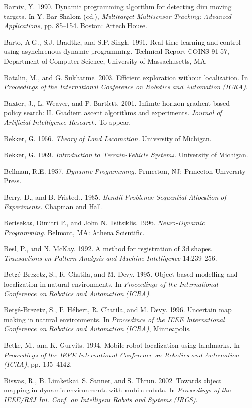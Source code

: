 \documentclass[10pt,a4paper]{article}
\begin{document}
Barniv, Y. 1990. Dynamic programming algorithm for detecting dim moving targets.
In Y. Bar-Shalom (ed.), \textit{Multitarget-Multisensor Tracking: Advanced Applications}, pp.
85–154. Boston: Artech House.

Barto, A.G., S.J. Bradtke, and S.P. Singh. 1991. Real-time learning and control using
asynchronous dynamic programming. Technical Report COINS 91-57, Department
of Computer Science, University of Massachusetts, MA.

Batalin, M., and G. Sukhatme. 2003. Efficient exploration without localization. In
\textit{Proceedings of the International Conference on Robotics and Automation (ICRA)}.

Baxter, J., L. Weaver, and P. Bartlett. 2001. Infinite-horizon gradient-based policy
search: II. Gradient ascent algorithms and experiments. \textit{Journal of Artificial Intelligence
Research.} To appear.

Bekker, G. 1956. \textit{Theory of Land Locomotion.} University of Michigan.

Bekker, G. 1969. \textit{Introduction to Terrain-Vehicle Systems.} University of Michigan.

Bellman, R.E. 1957. \textit{Dynamic Programming.} Princeton, NJ: Princeton University Press.

Berry, D., and B. Fristedt. 1985. \textit{Bandit Problems: Sequential Allocation of Experiments.}
Chapman and Hall.

Bertsekas, Dimitri P., and John N. Tsitsiklis. 1996. \textit{Neuro-Dynamic Programming.} Belmont,
MA: Athena Scientific.

Besl, P., and N. McKay. 1992. A method for registration of 3d shapes. \textit{Transactions on
Pattern Analysis and Machine Intelligence} 14:239–256.

Betgé-Brezetz, S., R. Chatila, and M. Devy. 1995. Object-based modelling and localization
in natural environments. In \textit{Proceedings of the International Conference on
Robotics and Automation (ICRA)}.

Betgé-Brezetz, S., P. Hébert, R. Chatila, and M. Devy. 1996. Uncertain map making in
natural environments. In \textit{Proceedings of the IEEE International Conference on Robotics
and Automation (ICRA)}, Minneapolis.

Betke, M., and K. Gurvits. 1994. Mobile robot localization using landmarks. In
\textit{Proceedings of the IEEE International Conference on Robotics and Automation (ICRA)},
pp. 135–4142.

Biswas, R., B. Limketkai, S. Sanner, and S. Thrun. 2002. Towards object mapping
in dynamic environments with mobile robots. In \textit{Proceedings of the IEEE/RSJ
Int. Conf. on Intelligent Robots and Systems (IROS)}.
\end{document}
